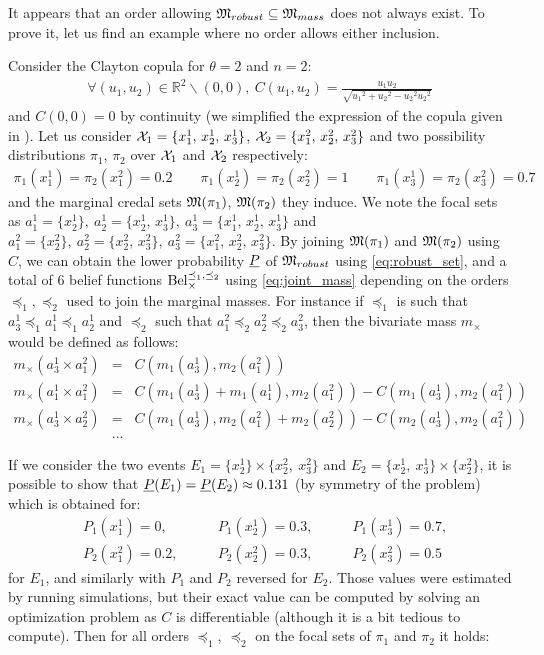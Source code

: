 It appears that an order allowing $\mathfrak{M}_{robust}\subseteq\mathfrak{M}_{mass}$ does not always exist. To prove it, let us find an example where no order allows either inclusion.
\begin{example}
Consider the Clayton copula for $\theta=2$ and $n=2$:
\begin{eqnarray*}
    \forall (u_1,u_2)\in\mathbb{R}^2\backslash(0,0), ~C(u_1,u_2)=\frac{u_1u_2}{\sqrt{{u_1}^2+{u_2}^2-{u_2}^2{u_2}^2}}
\end{eqnarray*}
and $C(0,0)=0$ by continuity (we simplified the expression of the copula given in ). Let us consider $\mathcal{X}_1=\{x^1_1,\, x^1_2,\, x^1_3\}$, $\mathcal{X}_2=\{x^2_1,\, x^2_2,\, x^2_3\}$ and two possibility distributions $\pi_1$, $\pi_2$ over $\mathcal{X}_1$ and $\mathcal{X}_2$ respectively:
\begin{eqnarray*}
    \pi_1(x^1_1)=\pi_2(x^2_1)=0.2 \qquad \pi_1(x^1_2)=\pi_2(x^2_2)=1 \qquad \pi_1(x^1_3)=\pi_2(x^2_3)=0.7 
\end{eqnarray*}
and the marginal credal sets $\mathfrak{M}(\pi_1)$, $\mathfrak{M}(\pi_2)$ they induce. We note the focal sets as $a^1_1=\{x^1_2\},~a^1_2=\{x^1_2,\, x^1_3\},~a^1_3=\{x^1_1,\,x^1_2,\,x^1_3\}$ and $a^2_1=\{x^2_2\},~a^2_2=\{x^2_2,\, x^2_3\},~a^2_3=\{x^2_1,\, x^2_2,\, x^2_3\}$. By joining $\mathfrak{M}(\pi_1)$ and $\mathfrak{M}(\pi_2)$ using $C$, we can obtain the lower probability $\underline{P}$ of $\mathfrak{M}_{robust}$ using \cref{eq:robust_set}, and a total of 6 belief functions $\mathrm{Bel}^{\preceq_1,\preceq_2}_\times$ using \cref{eq:joint_mass} depending on the orders $\preceq_1, \preceq_2$ used to join the marginal masses. For instance if $\preceq_1$ is such that $a^1_3\preceq_1 a^1_1 \preceq_1 a^1_2$ and $\preceq_2$ such that $a^2_1 \preceq_2 a^2_2 \preceq_2 a^2_3$, then the bivariate mass $m_\times$ would be defined as follows:
\begin{eqnarray*}
    m_\times(a^1_3\times a^2_1) &=& C(m_1(a^1_3), m_2(a^2_1))\\
    m_\times(a^1_1\times a^2_1) &=& C(m_1(a^1_3)+m_1(a^1_1), m_2(a^2_1)) - C(m_1(a^1_3), m_2(a^2_1))\\
    m_\times(a^1_3\times a^2_2) &=& C(m_1(a^1_3), m_2(a^2_1) + m_2(a^2_2)) - C(m_2(a^1_3), m_2(a^2_1))\\
    &\dots&
\end{eqnarray*}

If we consider the two events $E_1=\{x^1_2\}\times\{x^2_2,~x^2_3\}$ and $E_2=\{x^1_2,~x^1_3\}\times\{x^2_2\}$, it is possible to show that $\underline{P}(E_1)=\underline{P}(E_2)\approx0.131$ (by symmetry of the problem) which is obtained for:
\begin{align*}
    &P_1(x^1_1)=0, \qquad&P_1(x^1_2)=0.3, \qquad&P_1(x^1_3)=0.7,\\
    &P_2(x^2_1)=0.2, \qquad&P_2(x^2_2)=0.3, \qquad&P_2(x^2_3)=0.5
\end{align*}
for $E_1$, and similarly with $P_1$ and $P_2$ reversed for $E_2$. Those values were estimated by running simulations, but their exact value can be computed by solving an optimization problem as $C$ is differentiable (although it is a bit tedious to compute). Then for all orders $\preceq_1,~\preceq_2$ on the focal sets of $\pi_1$ and $\pi_2$ it holds:


\end{example}
